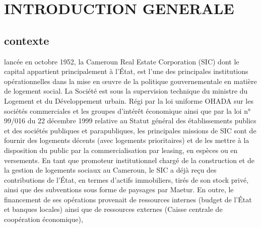 \documentclass[english,12pt,a4paper]{report}
\begin{document}
\cleardoublepage
{}

\listoffigures

\cleardoublepage
{}

\listoftables




\chapter*{INTRODUCTION GENERALE}
\vspace{0.8cm}

\section{contexte}
lancée en octobre 1952, la Cameroun Real Estate Corporation (SIC) dont le capital appartient principalement à l'État, est l'une des principales institutions opérationnelles dans la mise en œuvre de la politique gouvernementale en matière de logement social. La Société est sous la supervision technique du ministre du Logement et du Développement urbain. Régi par la loi uniforme OHADA sur les sociétés commerciales et les groupes d'intérêt économique ainsi que par la loi n° 99/016 du 22 décembre 1999 relative au Statut général des établissements publics et des sociétés publiques et parapubliques, les principales missions de SIC sont de fournir des logements décents (avec logements prioritaires) et de les mettre à la disposition du public par la commercialisation par leasing, en espèces ou en versements. En tant que promoteur institutionnel chargé de la construction et de la gestion de logements sociaux au Cameroun, le SIC a déjà reçu des contributions de l'État, en termes d'actifs immobiliers, tirés de son stock privé, ainsi que des subventions sous forme de paysages par Maetur. En outre, le financement de ses opérations provenait de ressources internes (budget de l'État et banques locales) ainsi que de ressources externes (Caisse centrale de coopération économique), 
\end{document}
